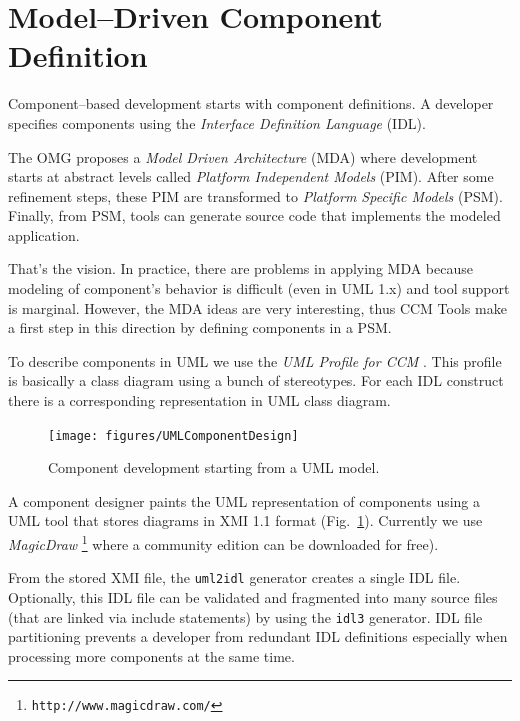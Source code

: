 \section{Model--Driven Component Definition}
\label{UMLComponentDesign}

Component--based development starts with component definitions.
A developer specifies components using the 
{\it Interface Definition Language} (IDL).

The OMG proposes a {\it Model Driven Architecture} (MDA) 
where development starts at abstract levels called 
{\it Platform Independent Models} (PIM).
After some refinement steps, these PIM are transformed to 
{\it Platform Specific Models} (PSM).
Finally, from PSM, tools can generate source code that implements the modeled 
application.

That's the vision. 
In practice, there are problems in applying MDA because modeling of 
component's behavior is difficult (even in UML 1.x) and tool support is 
marginal. 
However, the MDA ideas are very interesting, thus CCM Tools make a first step 
in this direction by defining components in a PSM.

To describe components in UML we use the {\it UML Profile for CCM} 
\cite{UML-CORBA-Profile,UML-CCM-Profile}. 
This profile is basically a class diagram using a bunch of stereotypes.
For each IDL construct there is a corresponding representation in UML class 
diagram.

\begin{figure}[htb]
    \begin{center}
        \texttt{[image: figures/UMLComponentDesign]}
        \caption{Component development starting from a UML model.}
        \label{fig:uml-component-design}
    \end{center}
\end{figure}

A component designer paints the UML representation of components using a UML 
tool that stores diagrams in XMI 1.1 format 
(Fig.~\ref{fig:uml-component-design}).
Currently we use {\it MagicDraw} 
\footnote
{
{\tt http://www.magicdraw.com/}
}
where a community edition can be downloaded 
for free).

From the stored XMI file, the {\tt uml2idl} generator creates a single IDL file.
Optionally, this IDL file can be validated and fragmented into many source files
(that are linked via include statements) by using the {\tt idl3} generator.
IDL file partitioning prevents a developer from redundant IDL definitions 
especially when processing more components at the same time.

